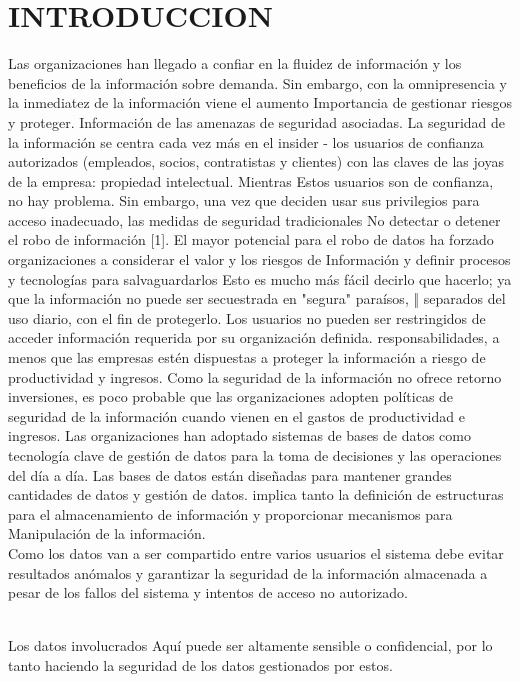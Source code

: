 \section{INTRODUCCION}
Las organizaciones han llegado a confiar en la fluidez de información y los beneficios de la información sobre
demanda. Sin embargo, con la omnipresencia y
la inmediatez de la información viene el aumento
Importancia de gestionar riesgos y proteger.
Información de las amenazas de seguridad asociadas.
La seguridad de la información se centra cada vez más en el insider - los usuarios de confianza autorizados (empleados, socios, contratistas y clientes) con las claves de las joyas de la empresa: propiedad intelectual. Mientras
Estos usuarios son de confianza, no hay problema.
Sin embargo, una vez que deciden usar sus privilegios para acceso inadecuado, las medidas de seguridad tradicionales No detectar o detener el robo de información [1].
El mayor potencial para el robo de datos ha forzado
organizaciones a considerar el valor y los riesgos de
Información y definir procesos y tecnologías para
salvaguardarlos Esto es mucho más fácil decirlo que hacerlo; ya que la información no puede ser secuestrada en "segura" paraísos, ‖ separados del uso diario, con el fin de protegerlo. Los usuarios no pueden ser restringidos de acceder información requerida por su organización definida.
responsabilidades, a menos que las empresas estén dispuestas a proteger la información a riesgo de productividad y
ingresos. Como la seguridad de la información no ofrece retorno inversiones, es poco probable que las organizaciones adopten políticas de seguridad de la información cuando vienen en el gastos de productividad e ingresos.
Las organizaciones han adoptado sistemas de bases de datos como tecnología clave de gestión de datos para la toma de decisiones y las operaciones del día a día. Las bases de datos están diseñadas para mantener grandes cantidades de datos y gestión de datos.
implica tanto la definición de estructuras para el almacenamiento de
información y proporcionar mecanismos para
Manipulación de la información.\\
Como los datos van a ser compartido entre varios usuarios el sistema debe evitar resultados anómalos y garantizar la seguridad de la información almacenada a pesar de los fallos del sistema y intentos de acceso no autorizado.

\\Los datos involucrados
Aquí puede ser altamente sensible o confidencial, por lo tanto haciendo la seguridad de los datos gestionados por estos.


